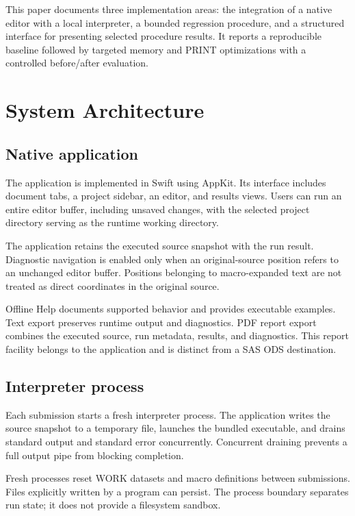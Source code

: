 \documentclass[11pt,a4paper]{article}
\begin{document}
This paper documents three implementation areas: the integration
of a native editor with a local interpreter, a bounded regression
procedure, and a structured interface for presenting selected
procedure results. It reports a reproducible baseline followed
by targeted memory and PRINT optimizations with a controlled
before/after evaluation.

\section{System Architecture}

\subsection{Native application}

The application is implemented in Swift using AppKit. Its
interface includes document tabs, a project sidebar, an editor,
and results views. Users can run an entire editor buffer,
including unsaved changes, with the selected project directory
serving as the runtime working directory.

The application retains the executed source snapshot with the
run result. Diagnostic navigation is enabled only when an
original-source position refers to an unchanged editor buffer.
Positions belonging to macro-expanded text are not treated as
direct coordinates in the original source.

Offline Help documents supported behavior and provides executable
examples. Text export preserves runtime output and diagnostics.
PDF report export combines the executed source, run metadata,
results, and diagnostics. This report facility belongs to the
application and is distinct from a SAS ODS destination.

\subsection{Interpreter process}

Each submission starts a fresh interpreter process. The
application writes the source snapshot to a temporary file,
launches the bundled executable, and drains standard output and
standard error concurrently. Concurrent draining prevents a full
output pipe from blocking completion.

Fresh processes reset WORK datasets and macro definitions between
submissions. Files explicitly written by a program can persist.
The process boundary separates run state; it does not provide a
filesystem sandbox.
\end{document}
